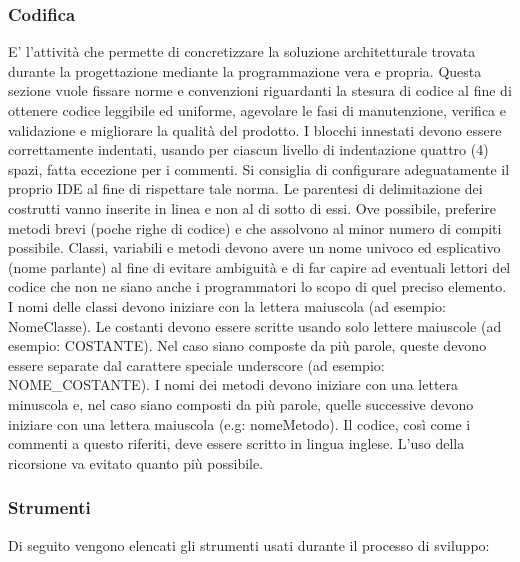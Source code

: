              \subsubsection{Codifica}
             E' l'attività che permette di concretizzare la soluzione architetturale trovata durante la progettazione mediante la programmazione vera e propria.
             Questa sezione vuole fissare norme e convenzioni riguardanti la stesura di codice al fine di ottenere codice leggibile ed uniforme, agevolare le fasi di manutenzione, verifica e validazione e migliorare la qualità del prodotto.
		I blocchi innestati devono essere correttamente indentati, usando per ciascun livello di indentazione quattro (4) spazi, fatta eccezione per i commenti. Si consiglia di configurare adeguatamente il proprio IDE al fine di rispettare tale norma.
		Le parentesi di delimitazione dei costrutti vanno inserite in linea e non al di sotto di essi.
		Ove possibile, preferire metodi brevi (poche righe di codice) e che assolvono al minor numero di compiti possibile.
		Classi, variabili e metodi devono avere un nome univoco ed esplicativo (nome parlante) al fine di evitare ambiguità e di far capire ad eventuali lettori del codice che non ne siano anche i programmatori lo scopo di quel preciso elemento.
		I nomi delle classi devono iniziare con la lettera maiuscola (ad esempio: NomeClasse).
		Le costanti devono essere scritte usando solo lettere maiuscole (ad esempio: COSTANTE). Nel caso siano composte da più parole, queste devono essere separate dal carattere speciale underscore (ad esempio: NOME\_COSTANTE).
		I nomi dei metodi devono iniziare con una lettera minuscola e, nel caso siano composti da più parole, quelle successive devono iniziare con una lettera maiuscola (e.g: nomeMetodo).
		Il codice, così come i commenti a questo riferiti, deve essere scritto in lingua inglese.
		L'uso della ricorsione va evitato quanto più possibile.
                
        \subsubsection{Strumenti}
        Di seguito vengono elencati gli strumenti usati durante il processo di sviluppo:
